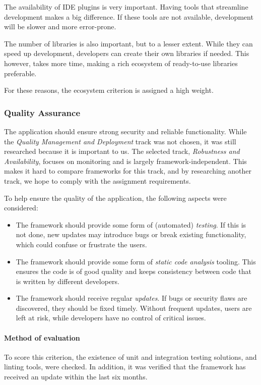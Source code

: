 The availability of IDE plugins is very important.
Having tools that streamline development makes a big difference.
If these tools are not available, development will be slower and more error-prone.

The number of libraries is also important, but to a lesser extent.
While they can speed up development, developers can create their own libraries if needed.
This however, takes more time, making a rich ecosystem of ready-to-use libraries preferable.

For these reasons, the ecosystem criterion is assigned a high weight.

\subsubsection{Quality Assurance}\label{subsubsec:quality-assurance}
The application should ensure strong security and reliable functionality.
While the \emph{Quality Management and Deployment} track was not chosen, it was still researched because it is important to us.
The selected track, \emph{Robustness and Availability}, focuses on monitoring and is largely framework-independent.
This makes it hard to compare frameworks for this track, and by researching another track, we hope to comply with the assignment requirements.

To help ensure the quality of the application, the following aspects were considered:

\begin{itemize}
	\item The framework should provide some form of (automated) \emph{testing}.
	      If this is not done, new updates may introduce bugs or break existing functionality, which could confuse or frustrate the users.
	\item The framework should provide some form of \emph{static code analysis} tooling.
	      This ensures the code is of good quality and keeps consistency between code that is written by different developers.
	\item The framework should receive regular \emph{updates}.
	      If bugs or security flaws are discovered, they should be fixed timely.
	      Without frequent updates, users are left at risk, while developers have no control of critical issues.
\end{itemize}

\paragraph{Method of evaluation}
To score this criterion, the existence of unit and integration testing solutions, and linting tools, were checked.
In addition, it was verified that the framework has received an update within the last six months.

